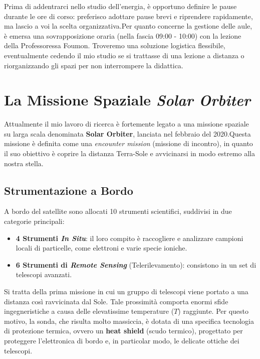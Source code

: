     Prima di addentrarci nello studio dell'energia, è opportuno definire le pause durante le ore di corso: preferisco adottare pause brevi e riprendere rapidamente, ma lascio a voi la scelta organizzativa.Per quanto concerne la gestione delle aule, è emersa una sovrapposizione oraria (nella fascia 09:00 - 10:00) con la lezione della Professoressa Foumon. Troveremo una soluzione logistica flessibile, eventualmente cedendo il mio studio se si trattasse di una lezione a distanza o riorganizzando gli spazi per non interrompere la didattica.\section{La Missione Spaziale \textit{Solar Orbiter}}Attualmente il mio lavoro di ricerca è fortemente legato a una missione spaziale su larga scala denominata \textbf{Solar Orbiter}, lanciata nel febbraio del 2020.Questa missione è definita come una \textit{encounter mission} (missione di incontro), in quanto il suo obiettivo è coprire la distanza Terra-Sole e avvicinarsi in modo estremo alla nostra stella.\subsection{Strumentazione a Bordo}A bordo del satellite sono allocati 10 strumenti scientifici, suddivisi in due categorie principali:\begin{itemize}\item \textbf{4 Strumenti \textit{In Situ}}: il loro compito è raccogliere e analizzare campioni locali di particelle, come elettroni e varie specie ioniche.\item \textbf{6 Strumenti di \textit{Remote Sensing}} (Telerilevamento): consistono in un set di telescopi avanzati.\end{itemize}Si tratta della prima missione in cui un gruppo di telescopi viene portato a una distanza così ravvicinata dal Sole. Tale prossimità comporta enormi sfide ingegneristiche a causa delle elevatissime temperature ($T$) raggiunte. Per questo motivo, la sonda, che risulta molto massiccia, è dotata di una specifica tecnologia di protezione termica, ovvero un \textbf{heat shield} (scudo termico), progettato per proteggere l'elettronica di bordo e, in particolar modo, le delicate ottiche dei telescopi.
    
